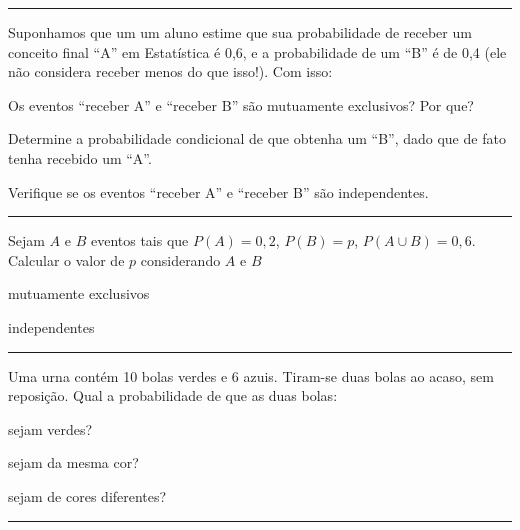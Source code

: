 \documentclass[a4paper,11pt,fleqn]{article}\usepackage[]{graphicx}\usepackage[]{color}
\theoremstyle{definition}
\begin{document}
\begin{compactenum}
\vspace{0.3cm}
\hrule
\vspace{0.3cm}

\item Suponhamos que um um aluno estime que sua probabilidade de receber um
  conceito final ``A'' em Estatística é 0,6, e a probabilidade de um
  ``B'' é de 0,4 (ele não considera receber menos do que isso!). Com isso:
  \begin{compactenum}
  \item Os eventos ``receber A'' e ``receber B'' são mutuamente
    exclusivos? Por que?
  \item Determine a probabilidade condicional de que obtenha um ``B'',
    dado que de fato tenha recebido um ``A''.
  \item Verifique se os eventos ``receber A'' e ``receber B'' são
    independentes.
  \end{compactenum}

\vspace{0.3cm}
\hrule
\vspace{0.3cm}

\item Sejam $A$ e $B$ eventos tais que $P(A) = 0,2$, $P(B) = p$, $P(A
  \cup B) = 0,6$. Calcular o valor de $p$ considerando $A$ e $B$
  \begin{compactenum}
  \item mutuamente exclusivos
  \item independentes
  \end{compactenum}

\vspace{0.3cm}
\hrule
\vspace{0.3cm}

\item Uma urna contém 10 bolas verdes e 6 azuis. Tiram-se duas bolas ao
  acaso, sem reposição. Qual a probabilidade de que as duas bolas:
  \begin{compactenum}
  \item sejam verdes?
  \item sejam da mesma cor?
  \item sejam de cores diferentes?
  \end{compactenum}

\vspace{0.3cm}
\hrule
\vspace{0.3cm}


\end{compactenum}
\end{document}
